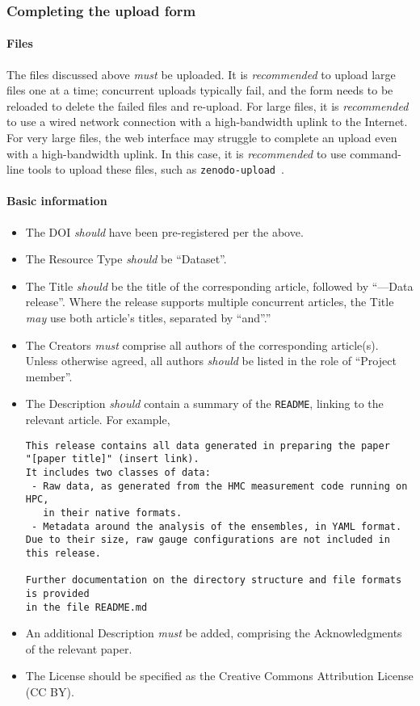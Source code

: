 \documentclass{article}
\newcommand\rfcword[1]{\emph{#1}\xspace}
\newcommand\must{\rfcword{must}}
\newcommand\should{\rfcword{should}}
\newcommand\recommended{\rfcword{recommended}}
\newcommand\may{\rfcword{may}}
\newcommand\filename[1]{\texttt{#1}\xspace}
\newcommand\readme{\filename{README}\xspace}
\begin{document}
\subsubsection{Completing the upload form}\label{sec:upload-form}

\paragraph{Files}

The files discussed above \must be uploaded.
It is \recommended to upload large files one at a time;
concurrent uploads typically fail,
and the form needs to be reloaded to delete the failed files and re-upload.
For large files,
it is \recommended to use a wired network connection
with a high-bandwidth uplink to the Internet.
For very large files,
the web interface may struggle to complete an upload even with a high-bandwidth uplink.
In this case,
it is \recommended to use command-line tools to upload these files,
such as \verb|zenodo-upload|~\cite{zenodo-upload}.


\paragraph{Basic information}

\begin{itemize}
  \item
        The DOI \should have been pre-registered per the above.
  \item
        The Resource Type \should be ``Dataset''.
  \item
        The Title \should be the title of the corresponding article,
        followed by ``---Data release''.
        Where the release supports multiple concurrent articles,
        the Title \may use both article's titles,
        separated by ``and''.''
  \item
        The Creators \must comprise all authors of the corresponding article(s).
        Unless otherwise agreed,
        all authors \should be listed in the role of ``Project member''.
  \item
        The Description \should contain a summary of the \readme,
        linking to the relevant article.
        For example,
\begin{verbatim}
This release contains all data generated in preparing the paper
"[paper title]" (insert link).
It includes two classes of data:
 - Raw data, as generated from the HMC measurement code running on HPC,
   in their native formats.
 - Metadata around the analysis of the ensembles, in YAML format.
Due to their size, raw gauge configurations are not included in this release.

Further documentation on the directory structure and file formats is provided
in the file README.md
\end{verbatim}
  \item
        An additional Description \must be added,
        comprising the Acknowledgments of the relevant paper.
  \item
        The License should be specified as the Creative Commons Attribution License
        (CC BY).
\end{itemize}
\end{document}
